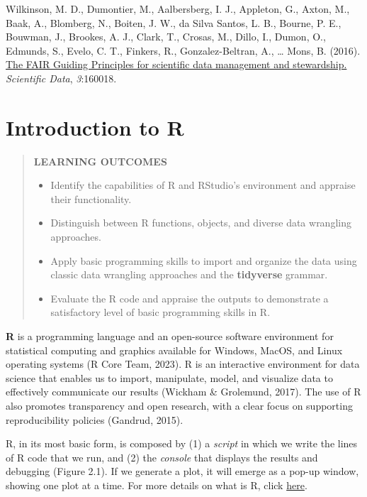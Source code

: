 \documentclass[
]{book}
\providecommand{\tightlist}{%
  \setlength{\itemsep}{0pt}\setlength{\parskip}{0pt}}
\theoremstyle{definition}
\theoremstyle{definition}
\theoremstyle{definition}
\theoremstyle{definition}
\theoremstyle{remark}
\begin{document}
Wilkinson, M. D., Dumontier, M., Aalbersberg, I. J., Appleton, G., Axton, M., Baak, A., Blomberg, N., Boiten, J. W., da Silva Santos, L. B., Bourne, P. E., Bouwman, J., Brookes, A. J., Clark, T., Crosas, M., Dillo, I., Dumon, O., Edmunds, S., Evelo, C. T., Finkers, R., Gonzalez-Beltran, A., \ldots{} Mons, B. (2016). \href{https://www.nature.com/articles/sdata201618}{The FAIR Guiding Principles for scientific data management and stewardship.} \emph{Scientific Data}, \emph{3}:160018.

\hypertarget{introduction-to-r}{%
\chapter{Introduction to R}\label{introduction-to-r}}

\begin{quote}
\textbf{LEARNING OUTCOMES}

\begin{itemize}
\tightlist
\item
  Identify the capabilities of R and RStudio's environment and appraise their functionality.
\item
  Distinguish between R functions, objects, and diverse data wrangling approaches.
\item
  Apply basic programming skills to import and organize the data using classic data wrangling approaches and the \textbf{tidyverse} grammar.
\item
  Evaluate the R code and appraise the outputs to demonstrate a satisfactory level of basic programming skills in R.
\end{itemize}
\end{quote}

\textbf{R} is a programming language and an open-source software environment for statistical computing and graphics available for Windows, MacOS, and Linux operating systems (R Core Team, 2023). R is an interactive environment for data science that enables us to import, manipulate, model, and visualize data to effectively communicate our results (Wickham \& Grolemund, 2017). The use of R also promotes transparency and open research, with a clear focus on supporting reproducibility policies (Gandrud, 2015).

R, in its most basic form, is composed by (1) a \emph{script} in which we write the lines of R code that we run, and (2) the \emph{console} that displays the results and debugging (Figure 2.1). If we generate a plot, it will emerge as a pop-up window, showing one plot at a time. For more details on what is R, click \href{http://www.r-project.org}{here}.
\end{document}
